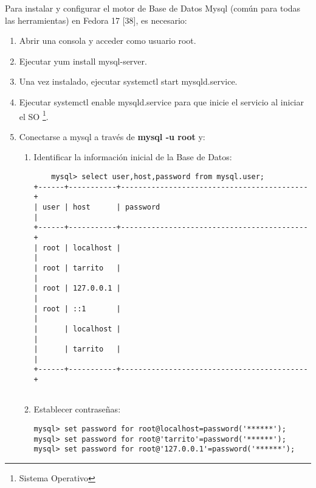 Para instalar y configurar el motor de Base de Datos Mysql (común para todas las herramientas) en Fedora 17 [38], es necesario:
\begin{enumerate}
 \item Abrir una consola y acceder como usuario root.
 \item Ejecutar yum install mysql-server.
 \item Una vez instalado, ejecutar systemctl start mysqld.service.
 \item Ejecutar systemctl enable mysqld.service para que inicie el servicio al iniciar el SO \footnote{Sistema Operativo}.
 \item Conectarse a mysql a través de \textbf{mysql -u root} y:
 \begin{enumerate}
  \item Identificar la información inicial de la Base de Datos:
   \begin{center}
   \begin{verbatim}
    mysql> select user,host,password from mysql.user;
+------+-----------+-------------------------------------------+
| user | host      | password                                  |
+------+-----------+-------------------------------------------+
| root | localhost |                                           |
| root | tarrito   |                                           |
| root | 127.0.0.1 |                                           |
| root | ::1       |                                           |
|      | localhost |                                           |
|      | tarrito   |                                           |
+------+-----------+-------------------------------------------+


   \end{verbatim}
   \end{center}
\item Establecer contraseñas:
   \begin{center}
   \begin{verbatim}
mysql> set password for root@localhost=password('******');
mysql> set password for root@'tarrito'=password('******');
mysql> set password for root@'127.0.0.1'=password('******');
   \end{verbatim}
   \end{center}


\end{enumerate}
\end{enumerate}
